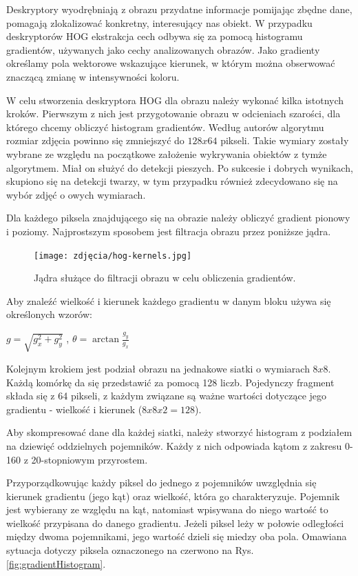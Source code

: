 Deskryptory wyodrębniają z obrazu przydatne informacje pomijając zbędne dane, pomagają zlokalizować konkretny, interesujący nas obiekt. W przypadku deskryptorów HOG  ekstrakcja cech odbywa się za pomocą histogramu gradientów, używanych jako cechy analizowanych obrazów. Jako gradienty określamy pola wektorowe wskazujące kierunek, w którym można obserwować znaczącą zmianę w intensywności koloru.

W celu stworzenia deskryptora HOG dla obrazu należy wykonać kilka istotnych kroków. \cite{hog2} Pierwszym z nich jest przygotowanie obrazu w odcieniach szarości, dla którego chcemy obliczyć histogram gradientów. Według autorów algorytmu rozmiar zdjęcia powinno się zmniejszyć do $128x64$ pikseli. Takie wymiary zostały wybrane ze względu na początkowe założenie wykrywania obiektów z tymże algorytmem. Miał on służyć do detekcji pieszych. Po sukcesie i dobrych wynikach, skupiono się na detekcji twarzy, w tym przypadku również zdecydowano się na wybór zdjęć o owych wymiarach.

Dla każdego piksela znajdującego się na obrazie należy obliczyć gradient pionowy i poziomy. Najprostszym sposobem jest filtracja obrazu przez poniższe jądra.

\begin{figure}[h]
	\centering
	\texttt{[image: zdjęcia/hog-kernels.jpg]}
	\caption{Jądra służące do filtracji obrazu w celu obliczenia gradientów. \cite{hog2}} 
	\label{fig:hogKernels}
\end{figure}

Aby znaleźć wielkość i kierunek każdego gradientu w danym bloku używa się określonych wzorów:
\begin{center}
    $g=\sqrt{g_{x}^{2}+g_{y}^{2}}$ ,
    $\theta=\arctan \frac{g_{y}}{g_{x}}$
\end{center}

Kolejnym krokiem jest podział obrazu na jednakowe siatki o wymiarach $8x8$. Każdą komórkę da się przedstawić za pomocą 128 liczb. Pojedynczy fragment składa się z 64 pikseli, z każdym związane są ważne wartości dotyczące jego gradientu - wielkość i kierunek ($8x8x2 = 128$). 

Aby skompresować dane dla każdej siatki, należy stworzyć histogram z podziałem na dziewięć oddzielnych pojemników. Każdy z nich odpowiada kątom z zakresu 0-160 z 20-stopniowym przyrostem.

Przyporządkowując każdy piksel do jednego z pojemników uwzględnia się kierunek gradientu (jego kąt) oraz wielkość, która go charakteryzuje. Pojemnik jest wybierany ze względu na kąt, natomiast wpisywana do niego wartość to wielkość przypisana do danego gradientu. Jeżeli piksel leży w połowie odległości między dwoma pojemnikami, jego wartość dzieli się miedzy oba pola. Omawiana sytuacja dotyczy piksela oznaczonego na czerwono na Rys. \ref{fig:gradientHistogram}. 

